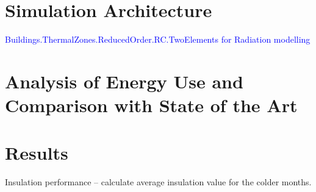 \section{Simulation Architecture}
\textcolor{blue}{Buildings.ThermalZones.ReducedOrder.RC.TwoElements for Radiation modelling}

\section{Analysis of Energy Use and Comparison with State of the Art}
\label{sec:sim-energy-and-comparison}

\section{Results}
\label{sec:simulation-results}
Insulation performance -- calculate average insulation value for the colder months.
